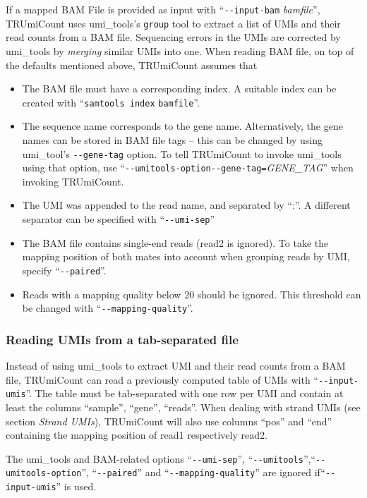 \documentclass[10pt]{article}
\newcommand{\ddarg}[1]{\texttt{-{}-#1}}
\begin{document}
If a mapped BAM File is provided as input with ``\ddarg{input-bam} \textit{bamfile}'', TRUmiCount uses umi\_tools's \texttt{group} tool to extract a list of UMIs and their read counts from a BAM file. Sequencing errors in the UMIs are corrected by umi\_tools by \emph{merging} similar UMIs into one. When reading BAM file, on top of the defaults mentioned above, TRUmiCount assumes that
\begin{itemize}
  \item The BAM file must have a corresponding index. A suitable index can be created with ``\texttt{samtools index} \texttt{bamfile}''.
  \item The sequence name corresponds to the gene name. Alternatively, the gene names can be stored in BAM file tags -- this can be changed by using umi\_tool's \ddarg{gene-tag} option. To tell TRUmiCount to invoke umi\_tools using that option, use ``\ddarg{umitools-option}\allowbreak\ddarg{gene-tag=}\allowbreak\textit{GENE\_TAG}'' when invoking TRUmiCount.
  \item The UMI was appended to the read name, and separated by ``:''. A different separator can be specified with ``\ddarg{umi-sep}''
  \item The BAM file contains single-end reads (read2 is ignored). To take the mapping position of both mates into account when grouping reads by UMI, specify ``\ddarg{paired}''.
  \item Reads with a mapping quality below 20 should be ignored. This threshold can be changed with ``\ddarg{mapping-quality}''.
\end{itemize}

\subsubsection*{Reading UMIs from a tab-separated file}

Instead of using umi\_tools to extract UMI and their read counts from a BAM file, TRUmiCount can read a previously computed table of UMIs with ``\ddarg{input-umis}''. The table must be tab-separated with one row per UMI and contain at least the columns ``sample'', ``gene'', ``reads''. When dealing with strand UMIs (see section \emph{Strand UMIs}), TRUmiCount will also use columns ``pos'' and ``end'' containing the mapping position of read1 respectively read2. 

The umi\_tools and BAM-related options ``\ddarg{umi-sep}'', ``\ddarg{umitools}'',\linebreak ``\ddarg{umitools-option}'', ``\ddarg{paired}'' and ``\ddarg{mapping-quality}'' are ignored if\linebreak ``\ddarg{input-umis}'' is used.
\end{document}
